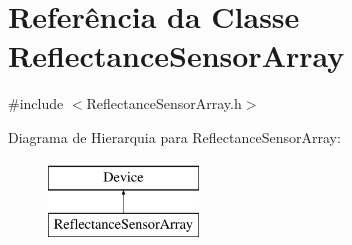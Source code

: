 \hypertarget{classReflectanceSensorArray}{\section{Referência da Classe Reflectance\-Sensor\-Array}
\label{classReflectanceSensorArray}
}


{\ttfamily \#include $<$Reflectance\-Sensor\-Array.\-h$>$}

Diagrama de Hierarquia para Reflectance\-Sensor\-Array\-:\begin{figure}[H]
\begin{center}
\leavevmode
\includegraphics[height=2.000000cm]{classReflectanceSensorArray}
\end{center}
\end{figure}
